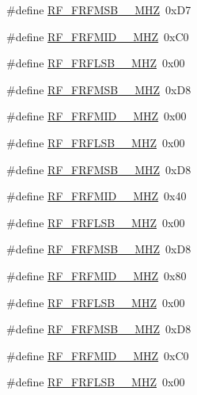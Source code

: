 \begin{DoxyCompactItemize}
\item 
\#define \hyperlink{sx1276Regs-Fsk_8h_a7c04c2dc8d6dcc63877be6ab7e60376f}{R\+F\+\_\+\+F\+R\+F\+M\+S\+B\+\_\+\_\+\+M\+HZ}~0x\+D7
\item 
\#define \hyperlink{sx1276Regs-Fsk_8h_a5e338d308b8d245fcadd0c54b17f2164}{R\+F\+\_\+\+F\+R\+F\+M\+I\+D\+\_\+\_\+\+M\+HZ}~0x\+C0
\item 
\#define \hyperlink{sx1276Regs-Fsk_8h_aecfa3c2f5b34cd5f809bbf1e10e467d4}{R\+F\+\_\+\+F\+R\+F\+L\+S\+B\+\_\+\_\+\+M\+HZ}~0x00
\item 
\#define \hyperlink{sx1276Regs-Fsk_8h_a67e8381b0688a6cedc0a9809e841b1bc}{R\+F\+\_\+\+F\+R\+F\+M\+S\+B\+\_\+\_\+\+M\+HZ}~0x\+D8
\item 
\#define \hyperlink{sx1276Regs-Fsk_8h_a012de711e32ef9690d9a2af46ffbb5eb}{R\+F\+\_\+\+F\+R\+F\+M\+I\+D\+\_\+\_\+\+M\+HZ}~0x00
\item 
\#define \hyperlink{sx1276Regs-Fsk_8h_aa2fb137b9b0807073842bddad9257e56}{R\+F\+\_\+\+F\+R\+F\+L\+S\+B\+\_\+\_\+\+M\+HZ}~0x00
\item 
\#define \hyperlink{sx1276Regs-Fsk_8h_a4789261c437ac2f175c6ec70f67018c4}{R\+F\+\_\+\+F\+R\+F\+M\+S\+B\+\_\+\_\+\+M\+HZ}~0x\+D8
\item 
\#define \hyperlink{sx1276Regs-Fsk_8h_a95dd5d402da457617be796822d2cc015}{R\+F\+\_\+\+F\+R\+F\+M\+I\+D\+\_\+\_\+\+M\+HZ}~0x40
\item 
\#define \hyperlink{sx1276Regs-Fsk_8h_a7efd19de747f0506749b11e4f95401e9}{R\+F\+\_\+\+F\+R\+F\+L\+S\+B\+\_\+\_\+\+M\+HZ}~0x00
\item 
\#define \hyperlink{sx1276Regs-Fsk_8h_aa17560da4e17ee817c1bb624e8267a54}{R\+F\+\_\+\+F\+R\+F\+M\+S\+B\+\_\+\_\+\+M\+HZ}~0x\+D8
\item 
\#define \hyperlink{sx1276Regs-Fsk_8h_ab841e5262361314bd63eaa7b4bcb9218}{R\+F\+\_\+\+F\+R\+F\+M\+I\+D\+\_\+\_\+\+M\+HZ}~0x80
\item 
\#define \hyperlink{sx1276Regs-Fsk_8h_a5fa819f17598b9e573c36d6e780b3fb6}{R\+F\+\_\+\+F\+R\+F\+L\+S\+B\+\_\+\_\+\+M\+HZ}~0x00
\item 
\#define \hyperlink{sx1276Regs-Fsk_8h_a1fd84bcd8872d01855cba3d13fe3bc32}{R\+F\+\_\+\+F\+R\+F\+M\+S\+B\+\_\+\_\+\+M\+HZ}~0x\+D8
\item 
\#define \hyperlink{sx1276Regs-Fsk_8h_ab234cf9eacbcdd90a4533c2021003a3d}{R\+F\+\_\+\+F\+R\+F\+M\+I\+D\+\_\+\_\+\+M\+HZ}~0x\+C0
\item 
\#define \hyperlink{sx1276Regs-Fsk_8h_a3dd2b64da47687e9f790392f01273113}{R\+F\+\_\+\+F\+R\+F\+L\+S\+B\+\_\+\_\+\+M\+HZ}~0x00

\end{DoxyCompactItemize}
